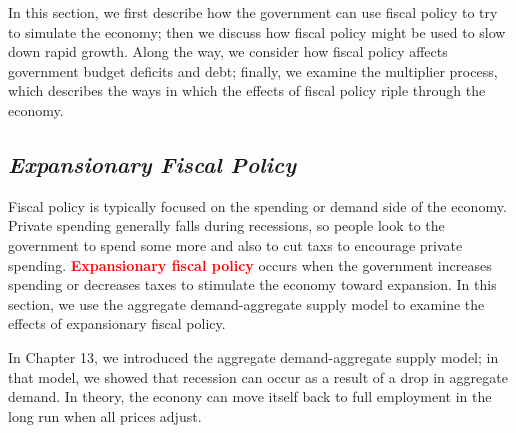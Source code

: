 \documentclass[11pt]{article} %
\begin{document}
In this section, we first describe how the government can use fiscal policy to try to simulate the economy; then we discuss how fiscal policy might be used to slow down rapid growth. Along the way, we consider how fiscal policy affects government budget deficits and debt; finally, we examine the multiplier process, which describes the ways in which the effects of fiscal policy riple through the economy.

\subsection*{\textbf{\textit{Expansionary Fiscal Policy}}}
Fiscal policy is typically focused on the spending or demand side of the economy. Private spending generally falls during recessions, so people look to the government to spend some more and also to cut taxs to encourage private spending. \textbf{\textcolor{red}{Expansionary fiscal policy}} occurs when the government increases spending or decreases taxes to stimulate the economy toward expansion. In this section, we use the aggregate demand-aggregate supply model to examine the effects of expansionary fiscal policy.

In Chapter 13, we introduced the aggregate demand-aggregate supply model; in that model, we showed that recession can occur as a result of a drop in aggregate demand. In theory, the econony can move itself back to full employment in the long run when all prices adjust.
\end{document}
